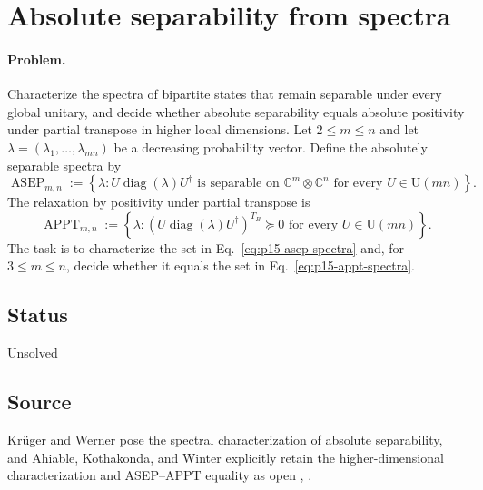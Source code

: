 \section{Absolute separability from spectra}
\label{sec:problem-15}

\paragraph{Problem.}
Characterize the spectra of bipartite states that remain separable under every
global unitary, and decide whether absolute separability equals absolute
positivity under partial transpose in higher local dimensions.  Let
$2\le m\le n$ and let
$\lambda=(\lambda_1,\ldots,\lambda_{mn})$ be a decreasing probability vector.
Define the absolutely separable spectra by
\begin{equation}
  \operatorname{ASEP}_{m,n}
  :=\left\{
    \lambda:
    U\operatorname{diag}(\lambda)U^\dagger
    \text{ is separable on }\mathbb{C}^m\otimes\mathbb{C}^n
    \text{ for every }U\in\mathrm{U}(mn)
  \right\}.
  \label{eq:p15-asep-spectra}
\end{equation}
The relaxation by positivity under partial transpose is
\begin{equation}
  \operatorname{APPT}_{m,n}
  :=\left\{
    \lambda:
    \left(U\operatorname{diag}(\lambda)U^\dagger\right)^{T_B}\succeq0
    \text{ for every }U\in\mathrm{U}(mn)
  \right\}.
  \label{eq:p15-appt-spectra}
\end{equation}
The task is to characterize the set in Eq.~\eqref{eq:p15-asep-spectra} and,
for $3\le m\le n$, decide whether it equals the set in
Eq.~\eqref{eq:p15-appt-spectra}.

\subsection*{Status}

Unsolved

\subsection*{Source}

Kr\"uger and Werner pose the spectral characterization of absolute
separability, and Ahiable, Kothakonda, and Winter explicitly retain the
higher-dimensional characterization and ASEP--APPT equality as open
,
.

